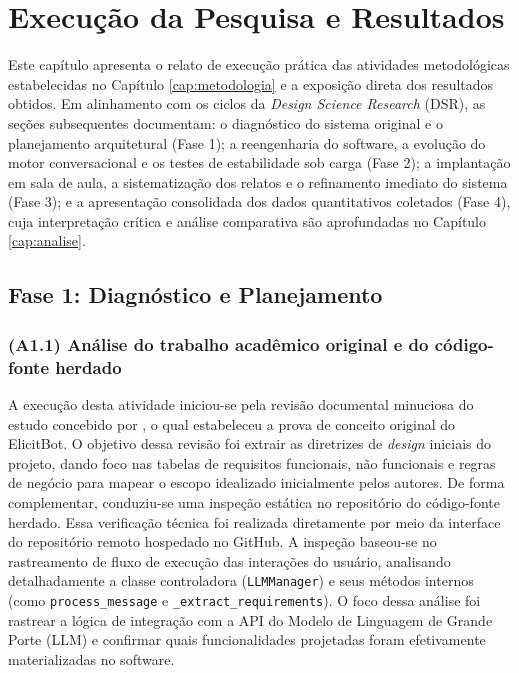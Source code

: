\chapter{Execução da Pesquisa e Resultados}
\label{cap:resultados}

Este capítulo apresenta o relato de execução prática das atividades metodológicas estabelecidas no Capítulo \ref{cap:metodologia} e a exposição direta dos resultados obtidos. Em alinhamento com os ciclos da \textit{Design Science Research} (DSR), as seções subsequentes documentam: o diagnóstico do sistema original e o planejamento arquitetural (Fase 1); a reengenharia do software, a evolução do motor conversacional e os testes de estabilidade sob carga (Fase 2); a implantação em sala de aula, a sistematização dos relatos e o refinamento imediato do sistema (Fase 3); e a apresentação consolidada dos dados quantitativos coletados (Fase 4), cuja interpretação crítica e análise comparativa são aprofundadas no Capítulo \ref{cap:analise}.

\section{Fase 1: Diagnóstico e Planejamento}

\subsection{(A1.1) Análise do trabalho acadêmico original e do código-fonte herdado}

A execução desta atividade iniciou-se pela revisão documental minuciosa do estudo concebido por , o qual estabeleceu a prova de conceito original do ElicitBot. O objetivo dessa revisão foi extrair as diretrizes de \textit{design} iniciais do projeto, dando foco nas tabelas de requisitos funcionais, não funcionais e regras de negócio para mapear o escopo idealizado inicialmente pelos autores. De forma complementar, conduziu-se uma inspeção estática no repositório do código-fonte herdado. Essa verificação técnica foi realizada diretamente por meio da interface do repositório remoto hospedado no GitHub. A inspeção baseou-se no rastreamento de fluxo de execução das interações do usuário, analisando detalhadamente a classe controladora (\texttt{LLMManager}) e seus métodos internos (como \texttt{process\_message} e \texttt{\_extract\_requirements}). O foco dessa análise foi rastrear a lógica de integração com a API do Modelo de Linguagem de Grande Porte (LLM) e confirmar quais funcionalidades projetadas foram efetivamente materializadas no software.

